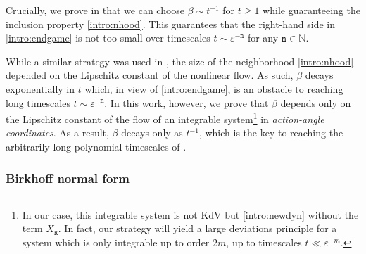\documentclass[a4paper,10pt,reqno]{article}
\theoremstyle{definition}
\theoremstyle{plain}
\theoremstyle{plain}
\theoremstyle{definition}
\theoremstyle{plain}
\theoremstyle{plain}
\theoremstyle{plain}
\theoremstyle{definition}
\theoremstyle{definition}
\def \N{\mathbb N}
\def \tn{\mathtt{n}}
\begin{document}
\smallskip

Crucially, we prove in  that we can choose $\beta \sim t^{-1}$ for $t\geq 1$ while guaranteeing the inclusion property \eqref{intro:nhood}. This guarantees that the right-hand side in \eqref{intro:endgame} is not too small over timescales $t\sim\varepsilon^{-\tn}$ for any $\tn\in\N$.

While a similar strategy was used in \cite{bertimasperograndestaffilani}, the size of the neighborhood \eqref{intro:nhood} depended on the Lipschitz constant of the nonlinear flow. As such, $\beta$ decays exponentially in $t$ which, in view of \eqref{intro:endgame}, is an obstacle to reaching long timescales $t\sim \varepsilon^{-\tn}$. In this work, however, we prove that $\beta$ depends only on the Lipschitz constant of the flow of an integrable system\footnote{In our case, this integrable system is not KdV but \eqref{intro:newdyn} without the term $X_{\mathtt{R}}$. In fact, our strategy will yield a large deviations principle for a system which is only integrable up to order $2m$, up to timescales $t \ll \varepsilon^{-m}$.} in \emph{action-angle coordinates}. As a result, $\beta$ decays only as $t^{-1}$, which is the key to reaching the arbitrarily long polynomial timescales of .

\subsubsection{Birkhoff normal form}\label{intro:BNF}
\end{document}
